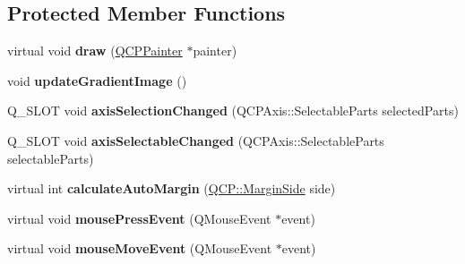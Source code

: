 \subsection*{Protected Member Functions}
\begin{DoxyCompactItemize}
\item 
\mbox{\label{class_q_c_p_color_scale_axis_rect_private_adb67bfe9057a9dd9a85f548c274e6d98}} 
virtual void {\bfseries draw} (\mbox{\hyperlink{class_q_c_p_painter}{Q\+C\+P\+Painter}} $\ast$painter)
\item 
\mbox{\label{class_q_c_p_color_scale_axis_rect_private_a73754cab312aeaddea1bfcc67cc079ac}} 
void {\bfseries update\+Gradient\+Image} ()
\item 
\mbox{\label{class_q_c_p_color_scale_axis_rect_private_a6112ad4291ac1695d37659cb049d598d}} 
Q\+\_\+\+S\+L\+OT void {\bfseries axis\+Selection\+Changed} (Q\+C\+P\+Axis\+::\+Selectable\+Parts selected\+Parts)
\item 
\mbox{\label{class_q_c_p_color_scale_axis_rect_private_a66d2baed86966bb03a6d7c32dc7d59f7}} 
Q\+\_\+\+S\+L\+OT void {\bfseries axis\+Selectable\+Changed} (Q\+C\+P\+Axis\+::\+Selectable\+Parts selectable\+Parts)
\item 
\mbox{\label{class_q_c_p_color_scale_axis_rect_private_ae79f18302e6507586aa8c032a5f9ed1c}} 
virtual int {\bfseries calculate\+Auto\+Margin} (\mbox{\hyperlink{namespace_q_c_p_a7e487e3e2ccb62ab7771065bab7cae54}{Q\+C\+P\+::\+Margin\+Side}} side)
\item 
\mbox{\label{class_q_c_p_color_scale_axis_rect_private_a77501dbeccdac7256f7979b05077c04e}} 
virtual void {\bfseries mouse\+Press\+Event} (Q\+Mouse\+Event $\ast$event)
\item 
\mbox{\label{class_q_c_p_color_scale_axis_rect_private_a4baf3d5dd69166788f6ceda0ea182c6e}} 
virtual void {\bfseries mouse\+Move\+Event} (Q\+Mouse\+Event $\ast$event)
\item 
\mbox{\label{class_q_c_p_color_scale_axis_rect_private_adf6c99780cea55ab39459a6eaad3a94a}} 

\end{DoxyCompactItemize}
